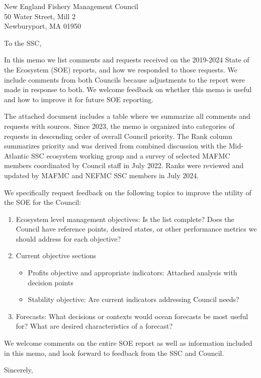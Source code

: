 \documentclass[11pt,]{letter}
\date{13 March, 2025}
\providecommand{\tightlist}{%
  \setlength{\itemsep}{0pt}\setlength{\parskip}{0pt}}
\begin{document}
\begin{letter}{New England Fishery Management Council\\50 Water Street,
Mill 2\\Newburyport, MA 01950}
\opening{To the SSC,}

In this memo we list comments and requests received on the 2019-2024
State of the Ecosystem (SOE) reports, and how we responded to those
requests. We include comments from both Councils because adjustments to
the report were made in response to both. We welcome feedback on whether
this memo is useful and how to improve it for future SOE reporting.

The attached document includes a table where we summarize all comments
and requests with sources. Since 2023, the memo is organized into
categories of requests in descending order of overall Council priority.
The Rank column summarizes priority and was derived from combined
discussion with the Mid-Atlantic SSC ecosystem working group and a
survey of selected MAFMC members coordinated by Council staff in July
2022. Ranks were reviewed and updated by MAFMC and NEFMC SSC members in
July 2024.

We specifically request feedback on the following topics to improve the
utility of the SOE for the Council:

\begin{enumerate}
\def\labelenumi{\arabic{enumi}.}
\tightlist
\item
  Ecosystem level management objectives: Is the list complete? Does the
  Council have reference points, desired states, or other performance
  metrics we should address for each objective?
\item
  Current objective sections

  \begin{itemize}
  \tightlist
  \item
    Profits objective and appropriate indicators: Attached analysis with
    decision points
  \item
    Stability objective: Are current indicators addressing Council
    needs?
  \end{itemize}
\item
  Forecasts: What decisions or contexts would ocean forecasts be most
  useful for? What are desired characteristics of a forecast?
\end{enumerate}

We welcome comments on the entire SOE report as well as information
included in this memo, and look forward to feedback from the SSC and
Council.

\longindentation=0pt
\closing{Sincerely,}

\end{letter}
\end{document}

